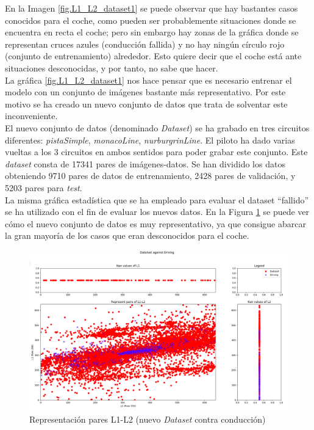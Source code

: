 En la Imagen \ref{fig.L1_L2_dataset1} se puede observar que hay bastantes casos conocidos para el coche, como pueden ser probablemente situaciones donde se encuentra en recta el coche; pero sin embargo hay zonas de la gráfica donde se representan cruces azules (conducción fallida) y no hay ningún círculo rojo (conjunto de entrenamiento) alrededor. Esto quiere decir que el coche está ante situaciones desconocidas, y por tanto, no sabe que hacer. \\

La gráfica \ref{fig.L1_L2_dataset1} nos hace pensar que es necesario entrenar el modelo con un conjunto de imágenes bastante más representativo. Por este motivo se ha creado un nuevo conjunto de datos que trata de solventar este inconveniente.\\

El nuevo conjunto de datos (denominado \textit{Dataset}) se ha grabado en tres circuitos diferentes: \textit{pistaSimple}, \textit{monacoLine}, \textit{nurburgrinLine}. El piloto ha dado varias vueltas a los 3 circuitos en ambos sentidos para poder grabar este conjunto. Este \textit{dataset} consta de 17341 pares de imágenes-datos. Se han dividido los datos obteniendo 9710 pares de datos de entrenamiento, 2428 pares de validación, y 5203 pares para \textit{test}.\\

La misma gráfica estadística que se ha empleado para evaluar el dataset ``fallido'' se ha utilizado con el fin de evaluar los nuevos datos. En la Figura \ref{fig.L1_L2_dataset3} se puede ver cómo el nuevo conjunto de datos es muy representativo, ya que consigue abarcar la gran mayoría de los casos que eran desconocidos para el coche.\\

\begin{figure}[H]
  \begin{center}
    \includegraphics[width=1\textwidth]{figures/Infraestructura/L1_L2_Dataset3.png}
		\caption{Representación pares L1-L2 (nuevo \textit{Dataset} contra conducción)}
		\label{fig.L1_L2_dataset3}
		\end{center}
\end{figure}

